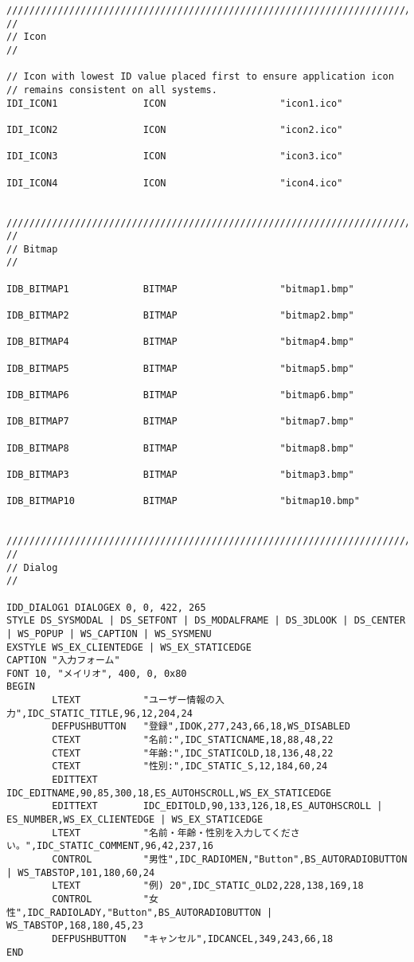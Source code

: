 \begin{lstlisting}[caption=resource.rc]
/////////////////////////////////////////////////////////////////////////////
//
// Icon
//

// Icon with lowest ID value placed first to ensure application icon
// remains consistent on all systems.
IDI_ICON1               ICON                    "icon1.ico"

IDI_ICON2               ICON                    "icon2.ico"

IDI_ICON3               ICON                    "icon3.ico"

IDI_ICON4               ICON                    "icon4.ico"


/////////////////////////////////////////////////////////////////////////////
//
// Bitmap
//

IDB_BITMAP1             BITMAP                  "bitmap1.bmp"

IDB_BITMAP2             BITMAP                  "bitmap2.bmp"

IDB_BITMAP4             BITMAP                  "bitmap4.bmp"

IDB_BITMAP5             BITMAP                  "bitmap5.bmp"

IDB_BITMAP6             BITMAP                  "bitmap6.bmp"

IDB_BITMAP7             BITMAP                  "bitmap7.bmp"

IDB_BITMAP8             BITMAP                  "bitmap8.bmp"

IDB_BITMAP3             BITMAP                  "bitmap3.bmp"

IDB_BITMAP10            BITMAP                  "bitmap10.bmp"


/////////////////////////////////////////////////////////////////////////////
//
// Dialog
//

IDD_DIALOG1 DIALOGEX 0, 0, 422, 265
STYLE DS_SYSMODAL | DS_SETFONT | DS_MODALFRAME | DS_3DLOOK | DS_CENTER | WS_POPUP | WS_CAPTION | WS_SYSMENU
EXSTYLE WS_EX_CLIENTEDGE | WS_EX_STATICEDGE
CAPTION "入力フォーム"
FONT 10, "メイリオ", 400, 0, 0x80
BEGIN
		LTEXT           "ユーザー情報の入力",IDC_STATIC_TITLE,96,12,204,24
		DEFPUSHBUTTON   "登録",IDOK,277,243,66,18,WS_DISABLED
		CTEXT           "名前:",IDC_STATICNAME,18,88,48,22
		CTEXT           "年齢:",IDC_STATICOLD,18,136,48,22
		CTEXT           "性別:",IDC_STATIC_S,12,184,60,24
		EDITTEXT        IDC_EDITNAME,90,85,300,18,ES_AUTOHSCROLL,WS_EX_STATICEDGE
		EDITTEXT        IDC_EDITOLD,90,133,126,18,ES_AUTOHSCROLL | ES_NUMBER,WS_EX_CLIENTEDGE | WS_EX_STATICEDGE
		LTEXT           "名前・年齢・性別を入力してください。",IDC_STATIC_COMMENT,96,42,237,16
		CONTROL         "男性",IDC_RADIOMEN,"Button",BS_AUTORADIOBUTTON | WS_TABSTOP,101,180,60,24
		LTEXT           "例) 20",IDC_STATIC_OLD2,228,138,169,18
		CONTROL         "女性",IDC_RADIOLADY,"Button",BS_AUTORADIOBUTTON | WS_TABSTOP,168,180,45,23
		DEFPUSHBUTTON   "キャンセル",IDCANCEL,349,243,66,18
END



\end{lstlisting}
